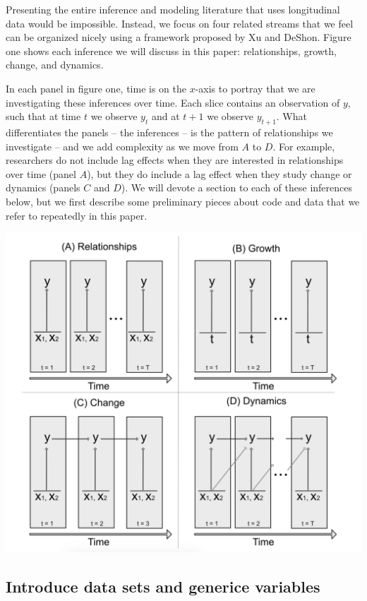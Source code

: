 \documentclass[english,,man]{apa6}
\theoremstyle{definition}
\theoremstyle{definition}
\theoremstyle{definition}
\theoremstyle{remark}
\begin{document}
Presenting the entire inference and modeling literature that uses
longitudinal data would be impossible. Instead, we focus on four related
streams that we feel can be organized nicely using a framework proposed
by Xu and DeShon. Figure one shows each inference we will discuss in
this paper: relationships, growth, change, and dynamics.

In each panel in figure one, time is on the \(x\)-axis to portray that
we are investigating these inferences over time. Each slice contains an
observation of \(y\), such that at time \(t\) we observe \(y_{t}\) and
at \(t + 1\) we observe \(y_{t + 1}\). What differentiates the panels --
the inferences -- is the pattern of relationships we investigate -- and
we add complexity as we move from \(A\) to \(D\). For example,
researchers do not include lag effects when they are interested in
relationships over time (panel \(A\)), but they do include a lag effect
when they study change or dynamics (panels \(C\) and \(D\)). We will
devote a section to each of these inferences below, but we first
describe some preliminary pieces about code and data that we refer to
repeatedly in this paper.

\includegraphics{figures/common_models.png}

\hypertarget{introduce-data-sets-and-generice-variables}{%
\subsection{Introduce data sets and generice
variables}\label{introduce-data-sets-and-generice-variables}}
\end{document}
